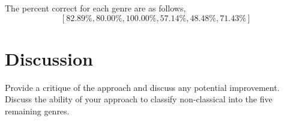 \documentclass[12pt]{article}
\begin{document}
The percent correct for each genre are as follows,
\[ [82.89\%, 80.00\%, 100.00\%, 57.14\%, 48.48\%, 71.43\%] \]




\section{Discussion}
Provide a critique of the approach and discuss any potential
improvement. Discuss the ability of your approach to classify
non-classical into the five remaining genres.
\end{document}
